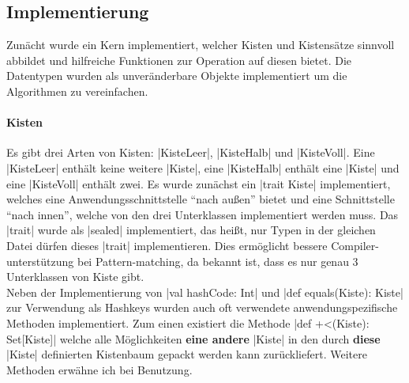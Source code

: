 \subsection{Implementierung}
\lstset{basicstyle=}
Zunächt wurde ein Kern implementiert, welcher Kisten und Kistensätze sinnvoll abbildet und hilfreiche Funktionen zur Operation auf diesen bietet.
Die Datentypen wurden als unveränderbare Objekte implementiert um die Algorithmen zu vereinfachen.
\paragraph{Kisten}
Es gibt drei Arten von Kisten: |KisteLeer|, |KisteHalb| und |KisteVoll|.
Eine |KisteLeer| enthält keine weitere |Kiste|, eine |KisteHalb| enthält eine |Kiste| und eine |KisteVoll| enthält zwei.
Es wurde zunächst ein |trait Kiste| implementiert, welches eine Anwendungsschnittstelle ``nach außen'' bietet und eine Schnittstelle ``nach innen'',
welche von den drei Unterklassen implementiert werden muss.
Das |trait| wurde als |sealed| implementiert, das heißt, nur Typen in der gleichen Datei dürfen dieses |trait| implementieren.
Dies ermöglicht bessere Compiler-unterstützung bei Pattern-matching, da bekannt ist, dass es nur genau 3 Unterklassen von Kiste gibt. \\
Neben der Implementierung von |val hashCode: Int| und |def equals(Kiste): Kiste|
 zur Verwendung als Hash\-keys wurden auch oft verwendete anwendungspezifische Methoden implementiert.
Zum einen existiert die Methode |def +<(Kiste): Set[Kiste]| welche alle Möglichkeiten \textbf{eine andere} |Kiste| in den durch \textbf{diese} |Kiste| definierten Kistenbaum
gepackt werden kann zurückliefert. Weitere Methoden erwähne ich bei Benutzung.
